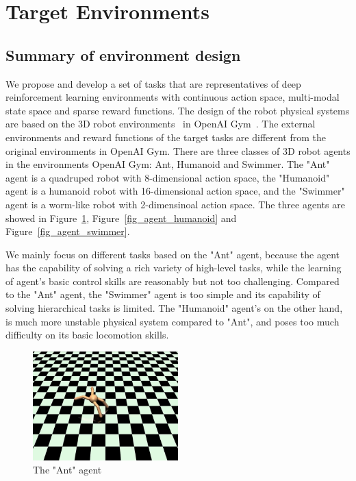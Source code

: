 \section{Target Environments}\label{sec_env}
\subsection{Summary of environment design}
We propose and develop a set of tasks that are representatives of deep reinforcement learning environments with continuous action space, multi-modal state space and sparse reward functions. The design of the robot physical systems are based on the 3D robot environments~\cite{roboschool_2018} in OpenAI Gym~\cite{openaigym}. The external environments and reward functions of the target tasks are different from the original environments in OpenAI Gym. There are three classes of 3D robot agents in the environments OpenAI Gym: Ant, Humanoid and Swimmer. The "Ant" agent is a quadruped robot with 8-dimensional action space, the "Humanoid" agent is a humanoid robot with 16-dimensional action space, and the "Swimmer" agent is a worm-like robot with 2-dimensinoal action space.  The three agents are showed in Figure~\ref{fig_agent_ant}, Figure~\ref{fig_agent_humanoid} and Figure~\ref{fig_agent_swimmer}.

We mainly focus on different tasks based on the "Ant" agent, because the agent has the capability of solving a rich variety of high-level tasks, while the learning of agent's basic control skills are reasonably but not too challenging. 
Compared to the "Ant" agent, the "Swimmer" agent is too simple and its capability of solving hierarchical tasks is limited. The "Humanoid" agent's on the other hand, is much more unstable physical system compared to "Ant", and poses too much difficulty on its basic locomotion skills.
\begin{figure}[H]
	\includegraphics[width=0.5\textwidth]{images/agent_ant.png}
	\centering
	\caption{The "Ant" agent}\label{fig_agent_ant}
\end{figure}


